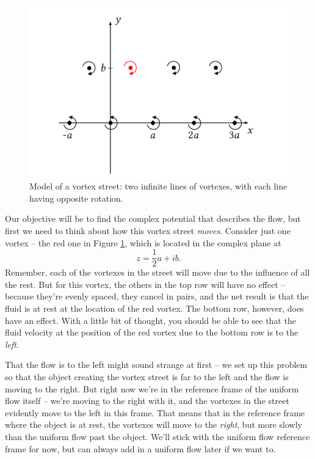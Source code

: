 \begin{figure}
\centering\includegraphics[width=0.7\linewidth]{Figures/Chapter4/fig_vortex_street1}
\caption{Model of a vortex street:  two infinite lines of vortexes, with each line having opposite rotation.}
\label{fig_vortex_street1}
\end{figure}


Our objective will be to find the complex potential that describes the flow, but first we need to think about how this vortex street \emph{moves}.  Consider just one vortex -- the red one in Figure \ref{fig_vortex_street1}, which is located in the complex plane at 
\[
z = \frac{1}{2} a + ib.
\]
Remember, each of the vortexes in the street will move due to the influence of all the rest.  But for this vortex, the others  in the top row will have no effect -- because they're evenly spaced, they cancel in pairs, and the net result is that the fluid is at rest at the location of the red vortex.  The bottom row, however, does have an effect.  With a little bit of thought, you should be able to see that the fluid velocity at the position of the red vortex due to the bottom row is to the \emph{left}.

That the flow is to the left might sound strange at first -- we set up this problem so that the object creating the vortex street is far to the left and the flow is moving to the right.  But right now we're in the reference frame of the uniform flow itself -- we're moving to the right with it, and the vortexes in the street evidently move to the left in this frame.  That means that in the reference frame where the object is at rest, the vortexes will move to the \emph{right}, but more slowly than the uniform flow past the object.  We'll stick with the uniform flow reference frame for now, but can always add in a uniform flow later if we want to.

